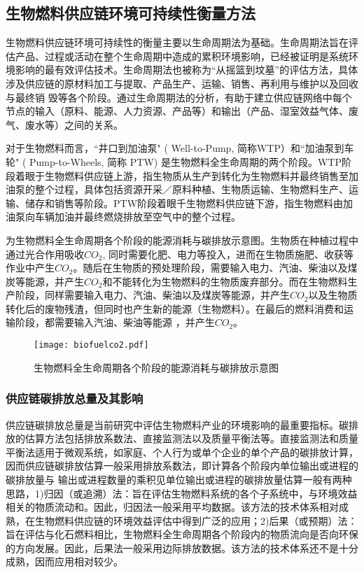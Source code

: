 \subsection{生物燃料供应链环境可持续性衡量方法}
生物燃料供应链环境可持续性的衡量主要以生命周期法为基础。生命周期法旨在评估产品、过程或活动在整个生命周期中造成的累积环境影响\cite{Akgul2012}，已经被证明是系统环境影响的最有效评估技术。生命周期法也被称为“从摇篮到坟墓”的评估方法，具体涉及供应链的原材料加工与提取、产品生产、运输、销售、再利用与维护以及回收与最终销  毁等各个阶段。通过生命周期法的分析，有助于建立供应链网络中每个节点的输入（原料、能源、人力资源、产品等）和输出（产品、湿室效益气体、废气、废水等）之间的关系\cite{Chaabane2012}。

对于生物燃料而言，“井口到加油泵" ( Well-to-Pump,  简称WTP）和“加油泵到车轮" ( Pump-to-Wheels, 简称 PTW) 是生物燃料全生命周期的两个阶段\cite{Ou2009}。WTP阶段着眼于生物燃料供应链上游，指生物质从生产到转化为生物燃料并最终销售至加油泵的整个过程，具体包括资源开采／原料种植、生物质运输、生物燃料生产、运输、储存和销售等阶段。PTW阶段着眼千生物燃料供应链下游，指生物燃料由加油泵向车辆加油并最终燃烧排放至空气中的整个过程。

为生物燃料全生命周期各个阶段的能源消耗与碳排放示意图。生物质在种植过程中通过光合作用吸收$CO_2$, 同时需要化肥、电力等投入，进而在生物质施肥、收获等作业中产生$CO_2$。随后在生物质的预处理阶段，需要输入电力、汽油、柴油以及煤炭等能源，并产生$CO_2$和不能转化为生物燃料的生物质废弃部分。而在生物燃料生产阶段，同样需要输入电力、汽油、柴油以及煤炭等能源，并产生$CO_2$以及生物质转化后的废物残渣，但同时也产生新的能源（生物燃料）。在最后的燃料消费和运输阶段，都需要输入汽油、柴油等能源 ，并产生$CO_2$。
\begin{figure}[htbp]
	\centering
	\texttt{[image: biofuelco2.pdf]}
	\caption{生物燃料全生命周期各个阶段的能源消耗与碳排放示意图}
	\label{fig:biofuelco2}
\end{figure}

\subsubsection{供应链碳排放总量及其影响}
供应链碳排放总量是当前研究中评估生物燃料产业的环境影响的最重要指标。碳排放的估算方法包括排放系数法、直接监测法以及质量平衡法等。直接监测法和质量平衡法适用于微观系统，如家庭、个人行为或单个企业的单个产品的碳排放计算，因而供应链碳排放估算一般采用排放系数法，即计算各个阶段内单位输出或进程的碳排放量与 输出或进程数量的乘积\cite{Liu2014}\cite{魏巧云2014}见单位输出或进程的碳排放量估算一般有两种思路，1)归因（或追溯）法：旨在评估生物燃料系统的各个子系统中，与环境效益相关的物质流动和。因此，归因法一般采用平均数据。该方法的技术体系相对成熟，在生物燃料供应链的环境效益评估中得到广泛的应用；2)后果（或预期）法：旨在评估与化石燃料相比，生物燃料全生命周期各个阶段内的物质流向是否向环保的方向发展。因此，后果法一般采用边际排放数据。该方法的技术体系还不是十分成熟，因而应用相对较少\cite{Malca2011}。

